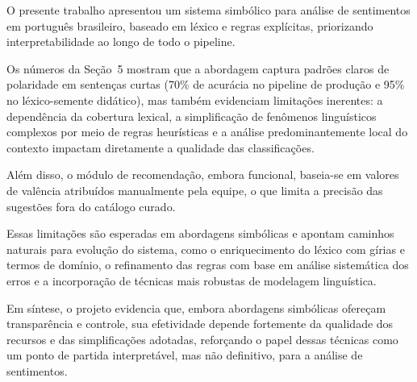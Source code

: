\documentclass[11pt,a4paper]{article}
\newcommand{\new}[1]{\textcolor{newblue}{#1}}
\begin{document}
O presente trabalho apresentou um sistema simbólico para análise de sentimentos em português brasileiro, baseado em léxico e regras explícitas, priorizando interpretabilidade ao longo de todo o pipeline.

\new{Os números da Seção~5 mostram que a abordagem captura padrões claros de polaridade em sentenças curtas (70\% de acurácia no pipeline de produção e 95\% no léxico-semente didático), mas também evidenciam limitações inerentes:} a dependência \new{da cobertura lexical}, a simplificação de fenômenos linguísticos complexos por meio de regras heurísticas e a análise predominantemente local do contexto impactam diretamente a qualidade das classificações.

Além disso, o módulo de recomendação, embora funcional, baseia-se em valores de valência atribuídos manualmente \new{pela equipe}, o que limita a precisão das sugestões \new{fora do catálogo curado}.

Essas limitações são esperadas em abordagens simbólicas e apontam caminhos naturais para evolução do sistema, como o enriquecimento do léxico \new{com gírias e termos de domínio}, o refinamento das regras \new{com base em análise sistemática dos erros} e a incorporação de técnicas mais robustas de modelagem linguística.

Em síntese, o projeto evidencia que, embora abordagens simbólicas ofereçam transparência e controle, sua efetividade depende fortemente da qualidade dos recursos e das simplificações adotadas, reforçando o papel dessas técnicas como um ponto de partida interpretável\new{, mas não definitivo,} para a análise de sentimentos.



\end{document}
